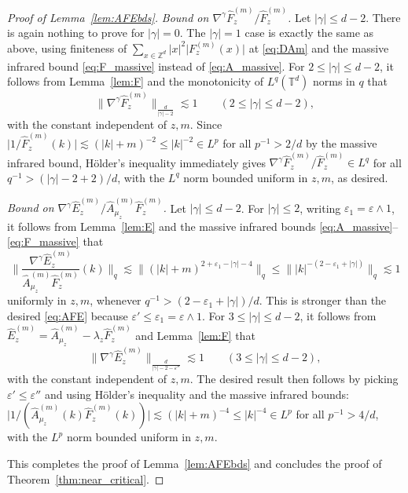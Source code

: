 \documentclass[11pt,hidelinks]{article}
\theoremstyle{plain}
\numberwithin{equation}{section}
\newcommand{\eps}{\varepsilon}
\newcommand{\Z}{\mathbb{Z}}
\newcommand{\T}{\mathbb{T}}
\newcommand{\grad}{\nabla}
\newcommand{\inv}{^{-1}}
\renewcommand{\(}{\left(}
\renewcommand{\)}{\right)}
\newcommand{\1}{\mathds{1}}
\providecommand{\abs}[1]{\lvert#1\rvert}
\providecommand{\bignorm}[1]{\big\lVert#1\big\rVert}
\providecommand{\biggnorm}[1]{\bigg\lVert#1\bigg\rVert}
\newcommand{\muz}{{\mu_z}}
\newcommand{\supm}{^{(m)}}
\begin{document}
\begin{proof}[Proof of Lemma~\ref{lem:AFEbds}]
\medskip\noindent
\emph{Bound on $\grad^\gamma \hat F_z\supm / \hat F_z\supm$.}
Let $ \abs \gamma \le d-2$.
There is again nothing to prove for $\abs \gamma =0$.
The $\abs \gamma = 1$ case is exactly the same as above, using finiteness of $\sum_{x\in \Z^d} \abs x^2 \abs{ F_z \supm(x) }$ at \eqref{eq:DAm} and the massive infrared bound \eqref{eq:F_massive} instead of \eqref{eq:A_massive}.
For $2 \le \abs \gamma \le d-2$, 
it follows from Lemma~\ref{lem:F} and the monotonicity of $L^q(\T^d)$ norms in $q$ that
\begin{equation} \label{eq:F_gamma}
\bignorm{ \grad^\gamma \hat F_z\supm }_{\frac d {\abs \gamma -2}}\lesssim 1 
	\qquad (2 \le \abs \gamma \le d-2 ),
\end{equation}
with the constant independent of $z,m$. 
Since $ \abs{ 1/ \hat F_z\supm (k) } \lesssim (\abs k+m)^{-2} \le \abs k^{-2} \in L^p$ for all $p\inv > 2/d$ by the massive infrared bound, H\"older's inequality immediately gives $ \grad^\gamma \hat F_z\supm / \hat F_z\supm \in L^q$ for all $q\inv > (\abs \gamma - 2 + 2)/d$, with the $L^q$ norm bounded uniform in $z,m$, as desired.



\medskip\noindent
\emph{Bound on $\grad^\gamma \hat E_z\supm / \hat A_\muz\supm \hat F_z\supm$.}
Let $\abs \gamma \le d-2$. 
For $\abs \gamma \le 2$, writing $\eps_1 = \eps \wedge 1$, it follows from Lemma~\ref{lem:E}
and the massive infrared bounds \eqref{eq:A_massive}--\eqref{eq:F_massive} that 
\begin{equation}
\biggnorm{ \frac{ \grad^\gamma \hat E_z \supm }{ \hat A_\muz\supm \hat F_z\supm} (k) }_q
\lesssim \bignorm{ (\abs k + m)^{ 2 + \eps_1 - \abs \gamma - 4} }_q
\le  \bignorm{ \abs k^{-(2 - \eps_1 + \abs \gamma )} }_q
\lesssim 1
\end{equation}
uniformly in $z,m$, whenever $q\inv > (2 - \eps_1 + \abs \gamma )/ d$.
This is stronger than the desired \eqref{eq:AFE} because $\eps' \le \eps_1 = \eps \wedge 1$. 
For $3 \le \abs \gamma \le d-2$, it follows from $\hat E_z \supm = \hat A_\muz \supm - \lambda_z \hat F_z \supm$ and Lemma~\ref{lem:F} that
\begin{equation} 
\bignorm{ \grad^\gamma \hat E_z\supm }_{ \frac d {\abs \gamma - 2 - \eps''} } \lesssim 1 
	\qquad (3 \le \abs \gamma \le d-2 ),
\end{equation}
with the constant independent of $z,m$. 
The desired result then follows by picking $\eps' \le \eps''$ and using H\"older's inequality and the massive infrared bounds: $ \abs{ 1/ ( \hat A_\muz\supm (k) \hat F_z\supm (k) )} \lesssim (\abs k+m)^{-4} \le \abs k^{-4} \in L^p$ for all $p\inv > 4/d$, with the $L^p$ norm bounded uniform in $z,m$. 

This completes the proof of Lemma~\ref{lem:AFEbds} and concludes the proof of Theorem~\ref{thm:near_critical}.
\end{proof}
\end{document}

